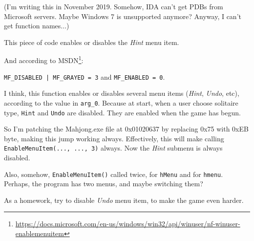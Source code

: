 (I'm writing this in November 2019. Somehow, IDA can't get PDBs from Microsoft servers. Maybe Windows 7 is unsupported anymore?
Anyway, I can't get function names...)



This piece of code enables or disables the \emph{Hint} menu item.

And according to MSDN\footnote{\url{https://docs.microsoft.com/en-us/windows/win32/api/winuser/nf-winuser-enablemenuitem}}:

\verb$MF_DISABLED | MF_GRAYED = 3$ and \verb|MF_ENABLED = 0|.

I think, this function enables or disables several menu items (\emph{Hint}, \emph{Undo}, etc), according to the value in \verb|arg_0|.
Because at start, when a user choose solitaire type, \verb|Hint| and \verb|Undo| are disabled.
They are enabled when the game has begun.

So I'm patching the Mahjong.exe file at 0x01020637 by replacing 0x75 with 0xEB byte, making this  jump working always.
Effectively, this will make calling \verb|EnableMenuItem(..., ..., 3)| always.
Now the \emph{Hint} submenu is always disabled.

Also, somehow, \verb|EnableMenuItem()| called twice, for \verb|hMenu| and for \verb|hmenu|.
Perhaps, the program has two menus, and maybe switching them?

As a homework, try to disable \emph{Undo} menu item, to make the game even harder.
